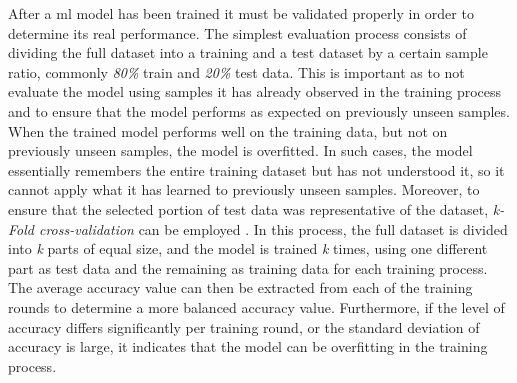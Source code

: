 After a \acrfull{ml} model has been trained it must be validated properly in order to determine its real performance. The simplest evaluation process consists of dividing the full dataset into a training and a test dataset by a certain sample ratio, commonly \textit{80\%} train and \textit{20\%} test data. This is important as to not evaluate the model using samples it has already observed in the training process and to ensure that the model performs as expected on previously unseen samples. When the trained model performs well on the training data, but not on previously unseen samples, the model is overfitted. In such cases, the model essentially remembers the entire training dataset but has not understood it, so it cannot apply what it has learned to previously unseen samples. Moreover, to ensure that the selected portion of test data was representative of the dataset, \textit{k-Fold cross-validation} can be employed \parencite{ghojogh2019theory}. In this process, the full dataset is divided into \textit{k} parts of equal size, and the model is trained \textit{k} times, using one different part as test data and the remaining as training data for each training process. The average accuracy value can then be extracted from each of the training rounds to determine a more balanced accuracy value. Furthermore, if the level of accuracy differs significantly per training round, or the standard deviation of accuracy is large, it indicates that the model can be overfitting in the training process.
